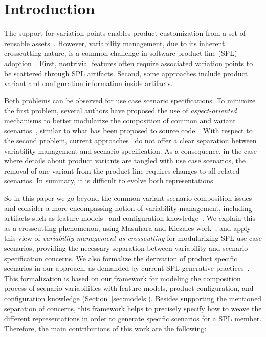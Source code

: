 \section{Introduction}
The support for variation points enables product customization from a set of
reusable assets~\cite{Pohl:2005aa}. However, variability management, due to its
inherent crosscutting nature, is a common challenge in software product line
(SPL) adoption~\cite{Clements:2001aa,Pohl:2005aa}. First, nontrivial features
often require associated variation points to be scattered through SPL artifacts.
Second, some approaches include product variant and configuration information
inside artifacts.

Both problems can be observed for use case scenario specifications. To minimize
the first problem, several authors have proposed the use of
\emph{aspect-oriented} mechanisms to better modularize the composition of common
and variant scenarios~\cite{moreira-re07,eriksson-splc-2005,pohl-caise-2005},
similar to what has been proposed to source code~\cite{alves-gpce-06,
apel-icse2006}. With respect to the second problem, current
approaches~\cite{favaro-icsr-98,Bertolino:2003aa,Eriksson:2005aa} do not offer a
clear separation between variability management and scenario specification. As a
consequence, in the case where details about product variants are tangled with
use case scenarios, the removal of one variant from the product line requires
changes to all related scenarios. In summary, it is difficult to evolve both
representations.

So in this paper we go beyond the common-variant scenario composition issues and
consider a more encompassing notion of variability management, including
artifacts such as feature models~\cite{gheyi-alloy-06,Czarnecki:2000aa} and
configuration knowledge~\cite{Czarnecki:2000aa,Pohl:2005aa}. We explain this as a
crosscutting phenomenon, using Masuhara and Kiczales work~\cite{Masuhara:2003aa},
and apply this view of \emph{variability management as crosscutting} for
modularizing SPL use case scenarios, providing the necessary separation between
variability and scenario specification concerns. We also formalize the derivation
of product specific scenarios in our approach, as demanded by current SPL
generative practices~\cite{krueger-cacm-200712}. This formalization is based on
our framework for modeling the composition process of scenario variabilities with
feature models, product configuration, and configuration knowledge
(Section~\ref{sec:models}). Besides supporting the mentioned separation of
concerns, this framework helps to precisely specify how to weave the different
representations in order to generate specific scenarios for a SPL member.
Therefore, the main contributions of this work are the following:

